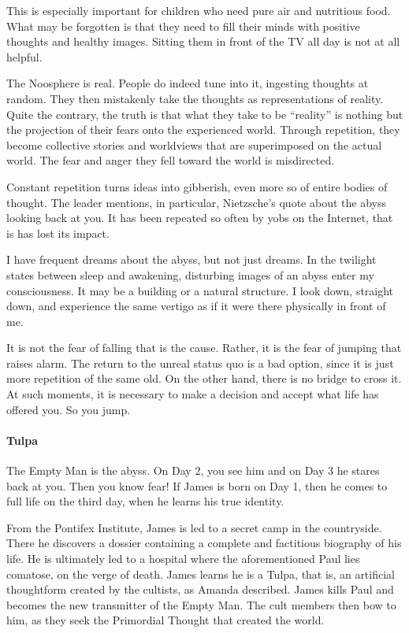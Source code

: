 This is especially important for children who need pure air and nutritious food. What may be forgotten is that they need to fill their minds with positive thoughts and healthy images. Sitting them in front of the TV all day is not at all helpful.

\begin{quotex}
The Noosphere is real. People do indeed tune into it, ingesting thoughts at random. They then mistakenly take the thoughts as representations of reality. Quite the contrary, the truth is that what they take to be ``reality'' is nothing but the projection of their fears onto the experienced world. Through repetition, they become collective stories and worldviews that are superimposed on the actual world. The fear and anger they fell toward the world is misdirected.
\end{quotex}


Constant repetition turns ideas into gibberish, even more so of entire bodies of thought. The leader mentions, in particular, Nietzsche's quote about the abyss looking back at you. It has been repeated so often by yobs on the Internet, that is has lost its impact.

\begin{quotationx}
I have frequent dreams about the abyss, but not just dreams. In the twilight states between sleep and awakening, disturbing images of an abyss enter my consciousness. It may be a building or a natural structure. I look down, straight down, and experience the same vertigo as if it were there physically in front of me.

It is not the fear of falling that is the cause. Rather, it is the fear of jumping that raises alarm. The return to the unreal status quo is a bad option, since it is just more repetition of the same old. On the other hand, there is no bridge to cross it. At such moments, it is necessary to make a decision and accept what life has offered you. So you jump.
\end{quotationx}


\paragraph{Tulpa}


The Empty Man is the abyss. On Day 2, you see him and on Day 3 he stares back at you. Then you know fear! If James is born on Day 1, then he comes to full life on the third day, when he learns his true identity.

From the Pontifex Institute, James is led to a secret camp in the countryside. There he discovers a dossier containing a complete and factitious biography of his life. He is ultimately led to a hospital where the aforementioned Paul lies comatose, on the verge of death. James learns he is a Tulpa, that is, an artificial thoughtform created by the cultists, as Amanda described. James kills Paul and becomes the new transmitter of the Empty Man. The cult members then bow to him, as they seek the Primordial Thought that created the world.


